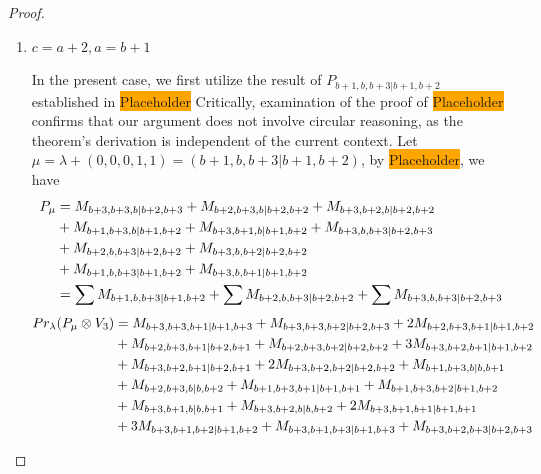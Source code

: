 \begin{proof}
\begin{enumerate}
\begin{enumerate}
        \item $c=a+2,a=b+1$ \par
        In the present case, we first utilize the result of $P_{b+1,b,b+3|b+1,b+2}$ established in \colorbox{orange}{Placeholder} Critically, examination of the proof of \colorbox{orange}{Placeholder} confirms that our argument does not involve circular reasoning, as the theorem's derivation is independent of the current context. Let $\mu = \lambda + (0,0,0,1,1) =(b+1,b,b+3|b+1,b+2) $, by \colorbox{orange}{Placeholder}, we have
        \begin{equation}\notag
          \begin{aligned}
            P_\mu &= M_{b+3,b+3,b|b+2,b+3}
+M_{b+2,b+3,b|b+2,b+2}
+M_{b+3,b+2,b|b+2,b+2}\\
                                              &
+M_{b+1,b+3,b|b+1,b+2}
+M_{b+3,b+1,b|b+1,b+2}
+M_{b+3,b,b+3|b+2,b+3}\\
                                              &
+M_{b+2,b,b+3|b+2,b+2}
+M_{b+3,b,b+2|b+2,b+2}\\
                                              &
+M_{b+1,b,b+3|b+1,b+2}
+M_{b+3,b,b+1|b+1,b+2}\\
                  &=
\sum M_{b+1,b,b+3|b+1,b+2}
+\sum M_{b+2,b,b+3|b+2,b+2}
+\sum M_{b+3,b,b+3|b+2,b+3}
          \end{aligned}
        \end{equation}
        \begin{equation}\notag
          \begin{aligned}
            Pr_{\lambda}(P_\mu \otimes V_{3}) &=
M_{b+3,b+3,b+1|b+1,b+3}
+ M_{b+3,b+3,b+2|b+2,b+3}
+ 2M_{b+2,b+3,b+1|b+1,b+2}\\
                                              &
+ M_{b+2,b+3,b+1|b+2,b+1}
+ M_{b+2,b+3,b+2|b+2,b+2}
+ 3M_{b+3,b+2,b+1|b+1,b+2}\\
                                              &
+ M_{b+3,b+2,b+1|b+2,b+1}
+ 2M_{b+3,b+2,b+2|b+2,b+2}
+ M_{b+1,b+3,b|b,b+1}\\
                                              &
+ M_{b+2,b+3,b|b,b+2}
+ M_{b+1,b+3,b+1|b+1,b+1}
+ M_{b+1,b+3,b+2|b+1,b+2}\\
                                              &
+ M_{b+3,b+1,b|b,b+1}
+ M_{b+3,b+2,b|b,b+2}
+ 2M_{b+3,b+1,b+1|b+1,b+1}\\
                                              &
+ 3M_{b+3,b+1,b+2|b+1,b+2}
+ M_{b+3,b+1,b+3|b+1,b+3}
+ M_{b+3,b+2,b+3|b+2,b+3}\\

\end{aligned}
\end{equation}
\end{enumerate}
\end{enumerate}
\end{proof}
